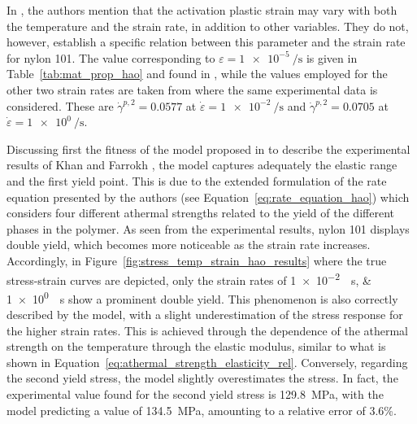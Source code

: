 In \cite{haoUnifiedAmorphousCrystalline2022}, the authors mention that the activation plastic strain may vary with both the temperature and the strain rate, in addition to other variables.
They do not, however, establish a specific relation between this parameter and the strain rate for nylon 101.
The value corresponding to $\varepsilon=\SI{1e-5}{\per\second}$ is given in Table~\ref{tab:mat_prop_hao} and found in \cite{haoUnifiedAmorphousCrystalline2022}, while the values employed for the other two strain rates are taken from \cite{haoRatedependentConstitutiveModel2022} where the same experimental data is considered.
These are $\dot\gamma^{p,2}=\num{0.0577}$ at $\dot\varepsilon = \SI{1e-2}{\per\second}$ and $\dot\gamma^{p,2}=\num{0.0705}$ at $\dot\varepsilon = \SI{1e0}{\per\second}$.

Discussing first the fitness of the model proposed in \cite{haoUnifiedAmorphousCrystalline2022} to describe the experimental results of Khan and Farrokh \citep{khanThermomechanicalResponseNylon2006}, the model captures adequately the elastic range and the first yield point.
This is due to the extended formulation of the rate equation presented by the authors (see Equation~\eqref{eq:rate_equation_hao}) which considers four different athermal strengths related to the yield of the different phases in the polymer.
As seen from the experimental results, nylon 101 displays double yield, which becomes more noticeable as the strain rate increases.
Accordingly, in Figure~\ref{fig:stress_temp_strain_hao_results} where the true stress-strain curves are depicted, only the strain rates of \SIlist{1e-2;1e0}{\per\second} show a prominent double yield.
This phenomenon is also correctly described by the model, with a slight underestimation of the stress response for the higher strain rates.
This is achieved through the dependence of the athermal strength on the temperature through the elastic modulus, similar to what is shown in Equation~\eqref{eq:athermal_strength_elasticity_rel}.
Conversely, regarding the second yield stress, the model slightly overestimates the stress.
In fact, the experimental value found for the second yield stress is \SI{129.8}{\mega\pascal}, with the model predicting a value of \SI{134.5}{\mega\pascal}, amounting to a relative error of \num{3.6}\%.

